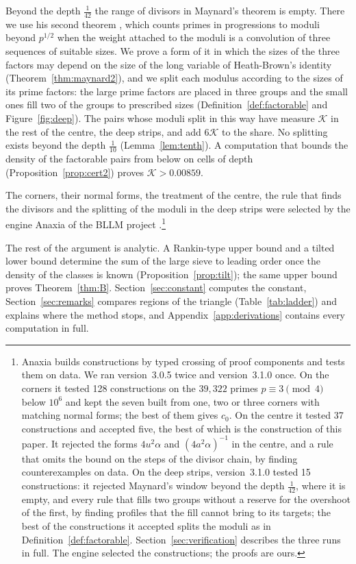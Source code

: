 \documentclass[aps,prd,twocolumn,superscriptaddress,nofootinbib,longbibliography,floatfix,showkeys,nobalancelastpage,amsmath,amssymb,10pt]{revtex4-2}
\theoremstyle{plain}
\theoremstyle{definition}
\theoremstyle{plain}
\newcommand{\Kc}{\mathcal{K}}
\newcommand{\Kbound}{0.00859}
\begin{document}
Beyond the depth $\frac1{42}$ the range of divisors in Maynard's theorem is empty. There we use his second theorem \cite{May2}, which counts primes in progressions to moduli beyond $p^{1/2}$ when the weight attached to the moduli is a convolution of three sequences of suitable sizes. We prove a form of it in which the sizes of the three factors may depend on the size of the long variable of Heath-Brown's identity (Theorem~\ref{thm:maynard2}), and we split each modulus according to the sizes of its prime factors: the large prime factors are placed in three groups and the small ones fill two of the groups to prescribed sizes (Definition~\ref{def:factorable} and Figure~\ref{fig:deep}). The pairs whose moduli split in this way have measure $\Kc$ in the rest of the centre, the deep strips, and add $6\Kc$ to the share. No splitting exists beyond the depth $\frac1{10}$ (Lemma~\ref{lem:tenth}). A computation that bounds the density of the factorable pairs from below on cells of depth (Proposition~\ref{prop:cert2}) proves $\Kc>\Kbound$.

The corners, their normal forms, the treatment of the centre, the rule that finds the divisors and the splitting of the moduli in the deep strips were selected by the engine Anaxia of the BLLM project \cite{Ana,BLLM}.\footnote{Anaxia builds constructions by typed crossing of proof components and tests them on data. We ran version~3.0.5 twice and version~3.1.0 once. On the corners it tested 128 constructions on the $39{,}322$ primes $p\equiv3\pmod4$ below $10^6$ and kept the seven built from one, two or three corners with matching normal forms; the best of them gives $c_0$. On the centre it tested 37 constructions and accepted five, the best of which is the construction of this paper. It rejected the forms $4u^2\alpha$ and $(4a^2\alpha)^{-1}$ in the centre, and a rule that omits the bound on the steps of the divisor chain, by finding counterexamples on data. On the deep strips, version~3.1.0 \cite{Ana31} tested 15 constructions: it rejected Maynard's window beyond the depth $\frac1{42}$, where it is empty, and every rule that fills two groups without a reserve for the overshoot of the first, by finding profiles that the fill cannot bring to its targets; the best of the constructions it accepted splits the moduli as in Definition~\ref{def:factorable}. Section~\ref{sec:verification} describes the three runs in full. The engine selected the constructions; the proofs are ours.}

The rest of the argument is analytic. A Rankin-type upper bound and a tilted lower bound determine the sum of the large sieve to leading order once the density of the classes is known (Proposition~\ref{prop:tilt}); the same upper bound proves Theorem~\ref{thm:B}. Section~\ref{sec:constant} computes the constant, Section~\ref{sec:remarks} compares regions of the triangle (Table~\ref{tab:ladder}) and explains where the method stops, and Appendix~\ref{app:derivations} contains every computation in full.
\end{document}
